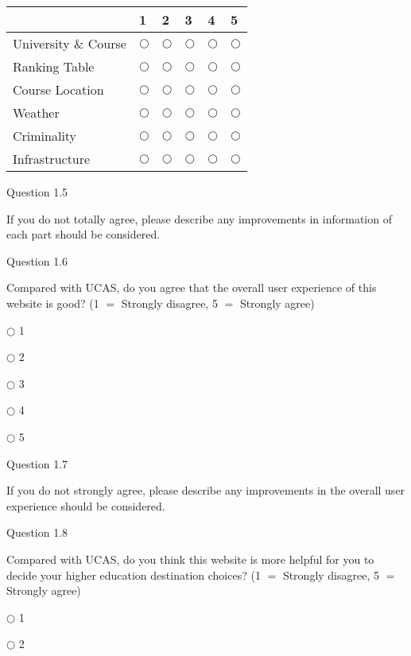 \begin{table}[H]
\begin{center}
\begin{tabular}{|p{4cm}|p{1.5cm}|p{1.5cm}|p{1.5cm}|p{1.5cm}|p{1.5cm}|}
\hline
& 
1 & 
2 & 
3 & 
4 & 
5 \\
\hline
University {\&} Course& 
$\bigcirc $& 
$\bigcirc $& 
$\bigcirc $& 
$\bigcirc $& 
$\bigcirc $ \\
\hline
Ranking Table& 
$\bigcirc $& 
$\bigcirc $& 
$\bigcirc $& 
$\bigcirc $& 
$\bigcirc $ \\
\hline
Course Location& 
$\bigcirc $& 
$\bigcirc $& 
$\bigcirc $& 
$\bigcirc $& 
$\bigcirc $ \\
\hline
Weather & 
$\bigcirc $& 
$\bigcirc $& 
$\bigcirc $& 
$\bigcirc $& 
$\bigcirc $ \\
\hline
Criminality& 
$\bigcirc $& 
$\bigcirc $& 
$\bigcirc $& 
$\bigcirc $& 
$\bigcirc $ \\
\hline
Infrastructure& 
$\bigcirc $& 
$\bigcirc $& 
$\bigcirc $& 
$\bigcirc $& 
$\bigcirc $ \\
\hline
\end{tabular}
\label{tab1}
\end{center}
\end{table}

Question 1.5

If you do not totally agree, please describe any improvements in information 
of each part should be considered.

Question 1.6

Compared with UCAS, do you agree that the overall user experience of this 
website is good? (1 $=$ Strongly disagree, 5 $=$ Strongly agree) 

$\bigcirc $ 1

$\bigcirc $ 2

$\bigcirc $ 3

$\bigcirc $ 4

$\bigcirc $ 5

Question 1.7

If you do not strongly agree, please describe any improvements in the 
overall user experience should be considered.

Question 1.8

Compared with UCAS, do you think this website is more helpful for you to 
decide your higher education destination choices? (1 $=$ Strongly disagree, 
5 $=$ Strongly agree) 

$\bigcirc $ 1

$\bigcirc $ 2

